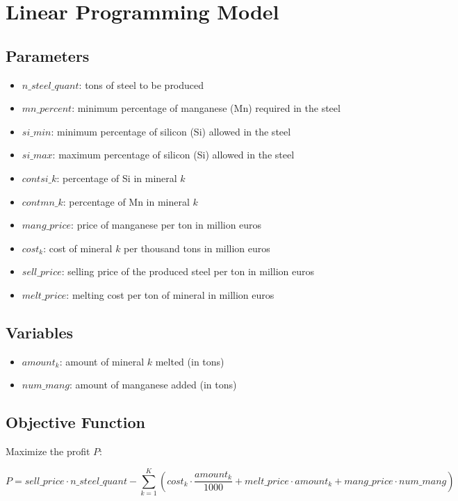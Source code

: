 \documentclass{article}
\begin{document}
\section*{Linear Programming Model}

\subsection*{Parameters}

\begin{itemize}
	\item $n\_steel\_quant$: tons of steel to be produced
	\item $mn\_percent$: minimum percentage of manganese (Mn) required in the steel
	\item $si\_min$: minimum percentage of silicon (Si) allowed in the steel
	\item $si\_max$: maximum percentage of silicon (Si) allowed in the steel
	\item $contsi\_k$: percentage of Si in mineral $k$
	\item $contmn\_k$: percentage of Mn in mineral $k$
	\item $mang\_price$: price of manganese per ton in million euros
	\item $cost_k$: cost of mineral $k$ per thousand tons in million euros
	\item $sell\_price$: selling price of the produced steel per ton in million euros
	\item $melt\_price$: melting cost per ton of mineral in million euros
\end{itemize}

\subsection*{Variables}

\begin{itemize}
	\item $amount_k$: amount of mineral $k$ melted (in tons)
	\item $num\_mang$: amount of manganese added (in tons)
\end{itemize}

\subsection*{Objective Function}

Maximize the profit $P$:

\[
P = sell\_price \cdot n\_steel\_quant - \sum_{k=1}^{K} \left( cost_k \cdot \frac{amount_k}{1000} + melt\_price \cdot amount_k + mang\_price \cdot num\_mang \right)
\]
\end{document}

